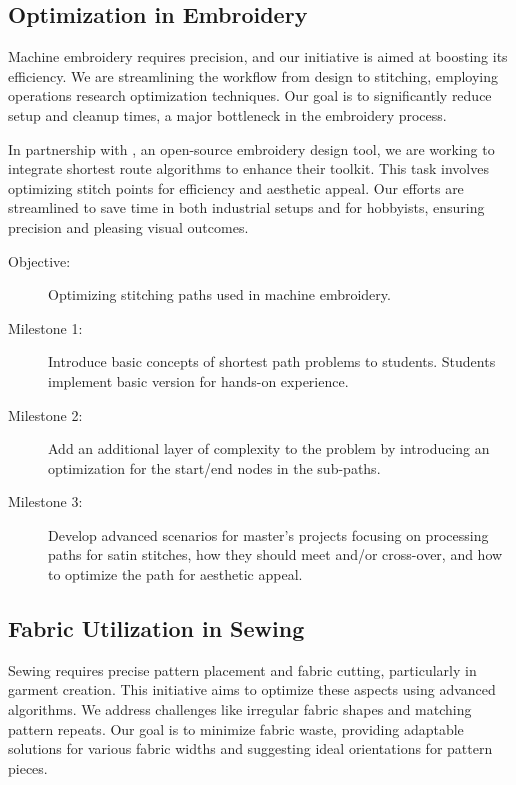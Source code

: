 \documentclass{article}
\begin{document}
    \subsection{Optimization in Embroidery}

    Machine embroidery requires precision, and our initiative is aimed at boosting its
    efficiency. We are streamlining the workflow from design to stitching, employing
    operations research optimization techniques. Our goal is to significantly reduce
    setup and cleanup times, a major bottleneck in the embroidery process.

    In partnership with \citet{inkstitch}, an open-source embroidery design tool, we are
    working to integrate shortest route algorithms to enhance their toolkit. This task
    involves optimizing stitch points for efficiency and aesthetic appeal. Our efforts are
    streamlined to save time in both industrial setups and for hobbyists, ensuring
    precision and pleasing visual outcomes.

    \begin{description}
        \item[Objective:] Optimizing stitching paths used in machine embroidery.
        \item[Milestone 1:] Introduce basic concepts of shortest path problems to students.
        Students implement basic version for hands-on experience.
        \item[Milestone 2:] Add an additional layer of complexity to the problem by introducing an optimization for
        the start/end nodes in the sub-paths.
        \item[Milestone 3:] Develop advanced scenarios for master's projects focusing on processing paths for satin
        stitches, how they should meet and/or cross-over, and how to optimize the path for aesthetic appeal.
    \end{description}

    \subsection{Fabric Utilization in Sewing}

    Sewing requires precise pattern placement and fabric cutting, particularly in garment creation.
    This initiative aims to optimize these aspects using advanced algorithms. We address challenges
    like irregular fabric shapes and matching pattern repeats. Our goal is to minimize fabric waste,
    providing adaptable solutions for various fabric widths and suggesting ideal orientations for pattern pieces.
\end{document}

